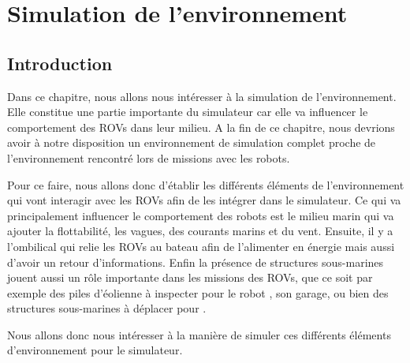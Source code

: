 \chapter{Simulation de l'environnement}
\label{chapitre:environnement}
	
	\section{Introduction}

		Dans ce chapitre, nous allons nous intéresser à la simulation de l'environnement. Elle constitue une partie importante du simulateur car elle va influencer le comportement des \gls{ROV}s dans leur milieu.  A la fin de ce chapitre, nous devrions avoir à notre disposition un environnement de simulation complet proche de l'environnement rencontré lors de missions avec les robots.

		Pour ce faire, nous allons donc d'établir les différents éléments de l'environnement qui vont interagir avec les \gls{ROV}s afin de les intégrer dans le simulateur. Ce qui va principalement influencer le comportement des robots est le milieu marin qui va ajouter la flottabilité, les vagues, des courants marins et du vent. Ensuite, il y a l'ombilical qui relie les \gls{ROV}s au bateau afin de l'alimenter en énergie mais aussi d'avoir un retour d'informations. Enfin la présence de structures sous-marines jouent aussi un rôle importante dans les missions des \gls{ROV}s, que ce soit par exemple des piles d'éolienne à inspecter pour le robot \argos{}, son garage, ou bien des structures sous-marines à déplacer pour \atoll{}.

		Nous allons donc nous intéresser à la manière de simuler ces différents éléments d'environnement pour le simulateur.



